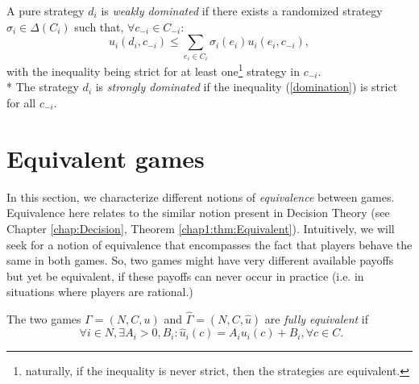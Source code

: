 \begin{definition}
A pure strategy $d_i$ is \emph{weakly dominated} if there exists a randomized strategy $\sigma_i \in \Delta(C_i)$ such that, $\forall c_{-i} \in C_{-i}$:
\begin{equation}
 u_i(d_i, c_{-i}) \leq \sum_{e_i \in C_i} \sigma_i(e_i) u_i(e_i, c_{-i}),
 \label{domination}
\end{equation}
with the inequality being strict for at least one\footnote{naturally, if the inequality is never strict, then the strategies are equivalent.} strategy in $c_{-i}$.\\*
The strategy $d_i$ is \emph{strongly dominated} if the inequality (\ref{domination}) is strict for all $c_{-i}$.
\label{defdomipayoffs}
 \end{definition}


\section{Equivalent games}
\label{chap2:subsec:Equivalences}

In this section, we characterize different notions of \emph{equivalence} between games.  Equivalence here relates to the similar notion present in Decision Theory (see Chapter \ref{chap:Decision}, Theorem \ref{chap1:thm:Equivalent}). Intuitively, we will seek for a notion of equivalence that encompasses the fact that players behave the same in both games. So, two games might have very different available payoffs but yet be equivalent, if these payoffs can never occur in practice (i.e. in situations where players are rational.)

\begin{definition}
The two games $\Gamma = (N, C, u)$ and $\hat \Gamma = (N,C,\hat{u})$ are \emph{fully equivalent} if
$$\,\,\forall i \in N, \exists A_i > 0, B_i : \hat u_i(c) = A_i u_i(c) + B_i, \forall c \in C.$$
\label{chap2:def:fullEquivalence}
\end{definition}

